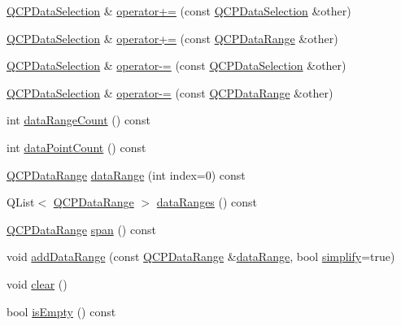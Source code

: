\begin{DoxyCompactItemize}
\item 
\hyperlink{classQCPDataSelection}{Q\+C\+P\+Data\+Selection} \& \hyperlink{classQCPDataSelection_a4584d4b0ea5c4f095bd7b70f88eb5d9d}{operator+=} (const \hyperlink{classQCPDataSelection}{Q\+C\+P\+Data\+Selection} \&other)
\item 
\hyperlink{classQCPDataSelection}{Q\+C\+P\+Data\+Selection} \& \hyperlink{classQCPDataSelection_a17058640d4e6f49984a0e7e42043df1b}{operator+=} (const \hyperlink{classQCPDataRange}{Q\+C\+P\+Data\+Range} \&other)
\item 
\hyperlink{classQCPDataSelection}{Q\+C\+P\+Data\+Selection} \& \hyperlink{classQCPDataSelection_a66f9fab70b026baa64bf8e52fe5de07e}{operator-\/=} (const \hyperlink{classQCPDataSelection}{Q\+C\+P\+Data\+Selection} \&other)
\item 
\hyperlink{classQCPDataSelection}{Q\+C\+P\+Data\+Selection} \& \hyperlink{classQCPDataSelection_a8d18b20d20dde737eefc10967e31cf73}{operator-\/=} (const \hyperlink{classQCPDataRange}{Q\+C\+P\+Data\+Range} \&other)
\item 
int \hyperlink{classQCPDataSelection_a7edbfbaf77e22f70216749e73818e247}{data\+Range\+Count} () const 
\item 
int \hyperlink{classQCPDataSelection_a492de1528df9cc6a73fd2883fe5b47b9}{data\+Point\+Count} () const 
\item 
\hyperlink{classQCPDataRange}{Q\+C\+P\+Data\+Range} \hyperlink{classQCPDataSelection_a6a9c39a2019cd6d2fdd329f415262b34}{data\+Range} (int index=0) const 
\item 
Q\+List$<$ \hyperlink{classQCPDataRange}{Q\+C\+P\+Data\+Range} $>$ \hyperlink{classQCPDataSelection_a74b63e4a98eb5eba0f6d77d2d4161a9a}{data\+Ranges} () const 
\item 
\hyperlink{classQCPDataRange}{Q\+C\+P\+Data\+Range} \hyperlink{classQCPDataSelection_a28057205d0b066f96b26bed79184b32b}{span} () const 
\item 
void \hyperlink{classQCPDataSelection_a46740c5aa7b80ae9b2abf6985d61b74f}{add\+Data\+Range} (const \hyperlink{classQCPDataRange}{Q\+C\+P\+Data\+Range} \&\hyperlink{classQCPDataSelection_a6a9c39a2019cd6d2fdd329f415262b34}{data\+Range}, bool \hyperlink{classQCPDataSelection_a4a2fbad1a6e4d1dd26fdfdf88956f2a4}{simplify}=true)
\item 
void \hyperlink{classQCPDataSelection_a385dd665e6690d39afb8bbd727b1e00b}{clear} ()
\item 
bool \hyperlink{classQCPDataSelection_a9d77ad4a54418bd0b74ef6b8076561d0}{is\+Empty} () const 
\item 

\end{DoxyCompactItemize}
